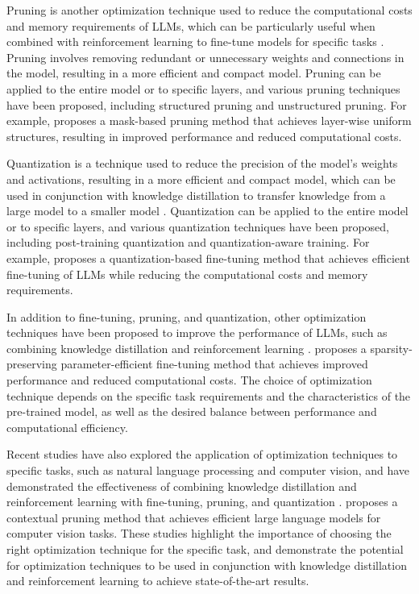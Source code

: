 \documentclass[11pt]{article}
\begin{document}
Pruning is another optimization technique used to reduce the computational costs and memory requirements of LLMs, which can be particularly useful when combined with reinforcement learning to fine-tune models for specific tasks \cite{ref99}. Pruning involves removing redundant or unnecessary weights and connections in the model, resulting in a more efficient and compact model. Pruning can be applied to the entire model or to specific layers, and various pruning techniques have been proposed, including structured pruning and unstructured pruning. For example, \cite{ref85} proposes a mask-based pruning method that achieves layer-wise uniform structures, resulting in improved performance and reduced computational costs.

Quantization is a technique used to reduce the precision of the model's weights and activations, resulting in a more efficient and compact model, which can be used in conjunction with knowledge distillation to transfer knowledge from a large model to a smaller model \cite{ref100}. Quantization can be applied to the entire model or to specific layers, and various quantization techniques have been proposed, including post-training quantization and quantization-aware training. For example, \cite{ref83} proposes a quantization-based fine-tuning method that achieves efficient fine-tuning of LLMs while reducing the computational costs and memory requirements.

In addition to fine-tuning, pruning, and quantization, other optimization techniques have been proposed to improve the performance of LLMs, such as combining knowledge distillation and reinforcement learning \cite{ref101}. \cite{ref102} proposes a sparsity-preserving parameter-efficient fine-tuning method that achieves improved performance and reduced computational costs. The choice of optimization technique depends on the specific task requirements and the characteristics of the pre-trained model, as well as the desired balance between performance and computational efficiency.

Recent studies have also explored the application of optimization techniques to specific tasks, such as natural language processing and computer vision, and have demonstrated the effectiveness of combining knowledge distillation and reinforcement learning with fine-tuning, pruning, and quantization \cite{ref103}. \cite{ref104} proposes a contextual pruning method that achieves efficient large language models for computer vision tasks. These studies highlight the importance of choosing the right optimization technique for the specific task, and demonstrate the potential for optimization techniques to be used in conjunction with knowledge distillation and reinforcement learning to achieve state-of-the-art results.
\end{document}
